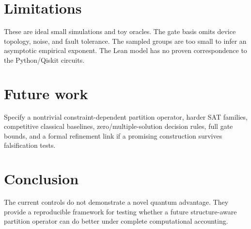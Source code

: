 \documentclass[11pt]{article}
\begin{document}
\section{Limitations}
These are ideal small simulations and toy oracles. The gate basis omits device topology, noise, and fault tolerance. The sampled groups are too small to infer an asymptotic empirical exponent. The Lean model has no proven correspondence to the Python/Qiskit circuits.

\section{Future work}
Specify a nontrivial constraint-dependent partition operator, harder SAT families, competitive classical baselines, zero/multiple-solution decision rules, full gate bounds, and a formal refinement link if a promising construction survives falsification tests.

\section{Conclusion}
The current controls do not demonstrate a novel quantum advantage. They provide a reproducible framework for testing whether a future structure-aware partition operator can do better under complete computational accounting.



\end{document}
